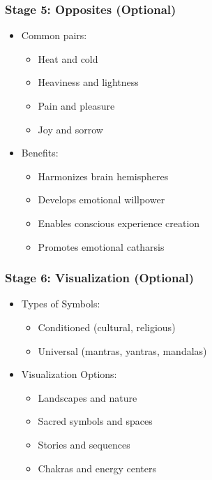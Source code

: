 \begin{frame}[fragile]\frametitle{Stage 5: Opposites (Optional)}
    \begin{itemize}
        \item Common pairs:
            \begin{itemize}
                \item Heat and cold
                \item Heaviness and lightness
                \item Pain and pleasure
                \item Joy and sorrow
            \end{itemize}
        \item Benefits:
            \begin{itemize}
                \item Harmonizes brain hemispheres
                \item Develops emotional willpower
                \item Enables conscious experience creation
                \item Promotes emotional catharsis
            \end{itemize}
    \end{itemize}
\end{frame}

\begin{frame}[fragile]\frametitle{Stage 6: Visualization (Optional)}
    \begin{itemize}
        \item Types of Symbols:
            \begin{itemize}
                \item Conditioned (cultural, religious)
                \item Universal (mantras, yantras, mandalas)
            \end{itemize}
        \item Visualization Options:
            \begin{itemize}
                \item Landscapes and nature
                \item Sacred symbols and spaces
                \item Stories and sequences
                \item Chakras and energy centers
            \end{itemize}
    \end{itemize}
\end{frame}

